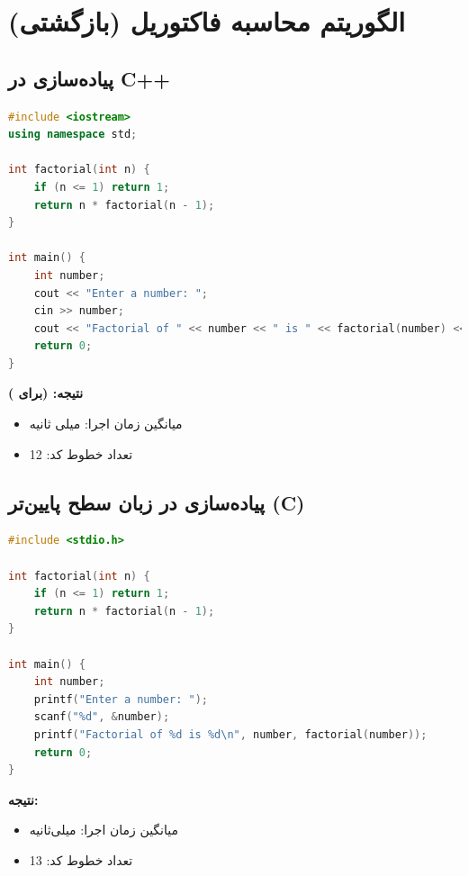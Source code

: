 \documentclass[12pt, a4paper]{report}
\begin{document}
\section{الگوریتم محاسبه فاکتوریل (بازگشتی)}


\subsection{پیاده‌سازی در C++}

\begin{LTR}
	\begin{lstlisting}[language=C++, breaklines=true]
#include <iostream>
using namespace std;

int factorial(int n) {
	if (n <= 1) return 1;
	return n * factorial(n - 1);
}

int main() {
	int number;
	cout << "Enter a number: ";
	cin >> number;
	cout << "Factorial of " << number << " is " << factorial(number) << endl;
	return 0;
}

	\end{lstlisting}
\end{LTR}

\textbf{نتیجه: (برای )} 
\begin{itemize}
	\item میانگین زمان اجرا:  میلی ثانیه
	\item تعداد خطوط کد: \textnormal{12}
\end{itemize}


\subsection{پیاده‌سازی در زبان سطح پایین‌تر (C)}

\begin{LTR}
\begin{lstlisting}[language=C, breaklines=true]
#include <stdio.h>

int factorial(int n) {
	if (n <= 1) return 1;
	return n * factorial(n - 1);
}

int main() {
	int number;
	printf("Enter a number: ");
	scanf("%d", &number);
	printf("Factorial of %d is %d\n", number, factorial(number));
	return 0;
}

	\end{lstlisting}
\end{LTR}

\textbf{نتیجه:}
\begin{itemize}
	\item میانگین زمان اجرا: \textnormal{} میلی‌ثانیه
	\item تعداد خطوط کد: \textnormal{13}
\end{itemize}
\end{document}
